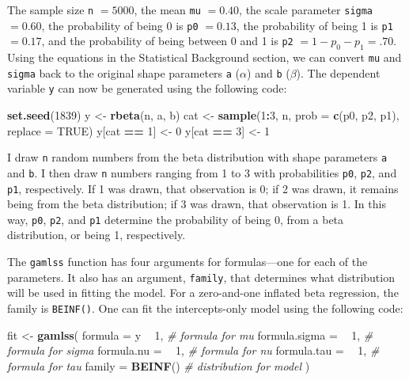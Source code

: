 \documentclass[english,,man]{apa6}
\newenvironment{Shaded}{\begin{snugshade}}{\end{snugshade}}
\newcommand{\CommentTok}[1]{\textcolor[rgb]{0.56,0.35,0.01}{\textit{#1}}}
\newcommand{\DataTypeTok}[1]{\textcolor[rgb]{0.13,0.29,0.53}{#1}}
\newcommand{\DecValTok}[1]{\textcolor[rgb]{0.00,0.00,0.81}{#1}}
\newcommand{\KeywordTok}[1]{\textcolor[rgb]{0.13,0.29,0.53}{\textbf{#1}}}
\newcommand{\NormalTok}[1]{#1}
\newcommand{\OperatorTok}[1]{\textcolor[rgb]{0.81,0.36,0.00}{\textbf{#1}}}
\newcommand{\OtherTok}[1]{\textcolor[rgb]{0.56,0.35,0.01}{#1}}
\newcommand{\StringTok}[1]{\textcolor[rgb]{0.31,0.60,0.02}{#1}}
\begin{document}
The sample size \texttt{n} \(= 5000\), the mean \texttt{mu} \(= 0.40\), the scale parameter \texttt{sigma} \(= 0.60\), the probability of being 0 is \texttt{p0} \(= 0.13\), the probability of being 1 is \texttt{p1} \(= 0.17\), and the probability of being between 0 and 1 is \texttt{p2} \(= 1 - p_0 - p_1 = .70\). Using the equations in the Statistical Background section, we can convert \texttt{mu} and \texttt{sigma} back to the original shape parameters \texttt{a} (\(\alpha\)) and \texttt{b} (\(\beta\)). The dependent variable \texttt{y} can now be generated using the following code:

\begin{Shaded}
\begin{Highlighting}[]
\KeywordTok{set.seed}\NormalTok{(}\DecValTok{1839}\NormalTok{)}
\NormalTok{y <-}\StringTok{ }\KeywordTok{rbeta}\NormalTok{(n, a, b)}
\NormalTok{cat <-}\StringTok{ }\KeywordTok{sample}\NormalTok{(}\DecValTok{1}\OperatorTok{:}\DecValTok{3}\NormalTok{, n, }\DataTypeTok{prob =} \KeywordTok{c}\NormalTok{(p0, p2, p1), }\DataTypeTok{replace =} \OtherTok{TRUE}\NormalTok{)}
\NormalTok{y[cat }\OperatorTok{==}\StringTok{ }\DecValTok{1}\NormalTok{] <-}\StringTok{ }\DecValTok{0}
\NormalTok{y[cat }\OperatorTok{==}\StringTok{ }\DecValTok{3}\NormalTok{] <-}\StringTok{ }\DecValTok{1}
\end{Highlighting}
\end{Shaded}

I draw \texttt{n} random numbers from the beta distribution with shape parameters \texttt{a} and \texttt{b}. I then draw \texttt{n} numbers ranging from 1 to 3 with probabilities \texttt{p0}, \texttt{p2}, and \texttt{p1}, respectively. If 1 was drawn, that observation is 0; if 2 was drawn, it remains being from the beta distribution; if 3 was drawn, that observation is 1. In this way, \texttt{p0}, \texttt{p2}, and \texttt{p1} determine the probability of being 0, from a beta distribution, or being 1, respectively.

The \texttt{gamlss} function has four arguments for formulas---one for each of the parameters. It also has an argument, \texttt{family}, that determines what distribution will be used in fitting the model. For a zero-and-one inflated beta regression, the family is \texttt{BEINF()}. One can fit the intercepts-only model using the following code:

\begin{Shaded}
\begin{Highlighting}[]
\NormalTok{fit <-}\StringTok{ }\KeywordTok{gamlss}\NormalTok{(}
  \DataTypeTok{formula =}\NormalTok{ y }\OperatorTok{~}\StringTok{ }\DecValTok{1}\NormalTok{,     }\CommentTok{# formula for mu}
  \DataTypeTok{formula.sigma =} \OperatorTok{~}\StringTok{ }\DecValTok{1}\NormalTok{, }\CommentTok{# formula for sigma}
  \DataTypeTok{formula.nu =} \OperatorTok{~}\StringTok{ }\DecValTok{1}\NormalTok{,    }\CommentTok{# formula for nu}
  \DataTypeTok{formula.tau =} \OperatorTok{~}\StringTok{ }\DecValTok{1}\NormalTok{,   }\CommentTok{# formula for tau}
  \DataTypeTok{family =} \KeywordTok{BEINF}\NormalTok{()     }\CommentTok{# distribution for model}
\NormalTok{)}
\end{Highlighting}
\end{Shaded}
\end{document}
